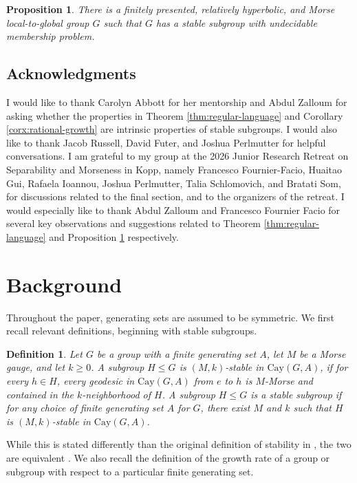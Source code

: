 \documentclass[10pt,a4paper]{amsart}
\newtheorem{propx}[thmx]{Proposition}
\newtheorem{definition}[theorem]{Definition}
\begin{document}
\begin{propx}\label{propx:counterexample}
    There is a finitely presented, relatively hyperbolic, and Morse local-to-global group $G$ such that $G$ has a stable subgroup with undecidable membership problem. 
\end{propx}

\subsection{Acknowledgments}
 I would like to thank Carolyn Abbott for her mentorship and Abdul Zalloum for asking whether the properties in Theorem \ref{thm:regular-language} and Corollary \ref{corx:rational-growth} are intrinsic properties of stable subgroups. I would also like to thank Jacob Russell, David Futer, and Joshua Perlmutter for helpful conversations. I am grateful to my group at the 2026 Junior Research Retreat on Separability and Morseness in Kopp, namely Francesco Fournier-Facio, Huaitao Gui, Rafaela Ioannou, Joshua Perlmutter, Talia Schlomovich, and Bratati Som, for discussions related to the final section, and to the organizers of the retreat. I would especially like to thank Abdul Zalloum and Francesco Fournier Facio for several key observations and suggestions related to Theorem \ref{thm:regular-language} and Proposition \ref{propx:counterexample} respectively.

\section{Background}
Throughout the paper, generating sets are assumed to be symmetric. We first recall relevant definitions, beginning with stable subgroups.

\begin{definition}\cite[Definition~2.22]{CRSZ}
    Let $G$ be a group with a finite generating set $A$, let $M$ be a Morse gauge, and let $k\geq 0$. A subgroup $H\leq G$ is \textit{$(M,k)$-stable} in $\text{Cay}(G,A)$, if for every $h\in H$, every geodesic in $\text{Cay}(G,A)$ from $e$ to $h$ is $M$-Morse and contained in the $k$-neighborhood of $H$. A subgroup $H\leq G$ is a \textit{stable subgroup} if for any choice of finite generating set $A$ for $G$, there exist $M$ and $k$ such that $H$ is $(M,k)$-stable in $\text{Cay}(G,A)$.
\end{definition}
While this is stated differently than the original definition of stability in \cite{Durham-Taylor-stability}, the two are equivalent \cite{Cordes-Hume-stability}. We also recall the definition of the growth rate of a group or subgroup with respect to a particular finite generating set. 
\end{document}
